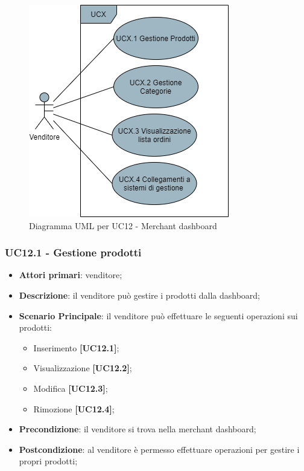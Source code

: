 \begin{figure}[H]
\centering
\includegraphics[scale=0.6]{res/UseCase/Immagini/MerchantDashboard}
\caption{Diagramma UML per UC12 - Merchant dashboard}
\end{figure}

\subsubsection{UC12.1 - Gestione prodotti}
\begin{itemize}
\item \textbf{Attori primari}: venditore;
\item \textbf{Descrizione}: il venditore può gestire i prodotti dalla dashboard;
\item \textbf{Scenario Principale}: il venditore può effettuare le seguenti operazioni sui prodotti:
\begin{itemize}
	\item Inserimento \textbf{[UC12.1]};
	\item Visualizzazione \textbf{[UC12.2]};
	\item Modifica \textbf{[UC12.3]};
	\item Rimozione \textbf{[UC12.4]};
\end{itemize}
\item \textbf{Precondizione}: il venditore si trova nella merchant dashboard;
\item \textbf{Postcondizione}: al venditore è permesso effettuare operazioni per gestire i propri prodotti;
\end{itemize}

